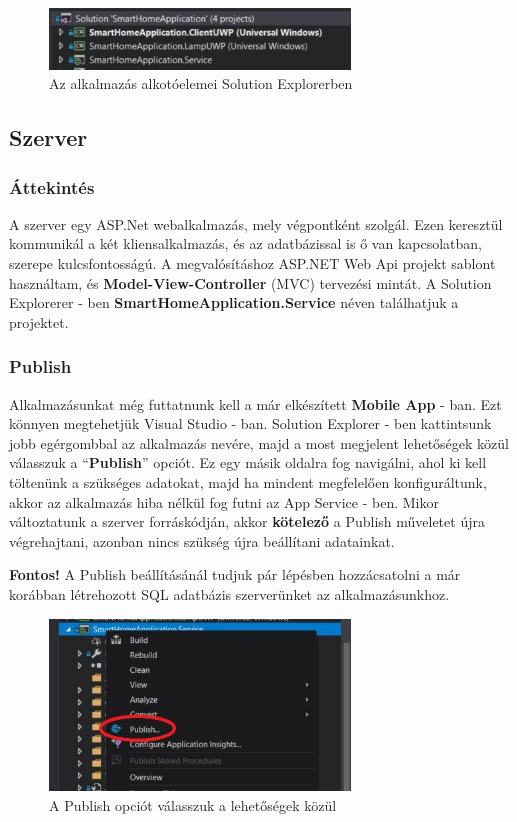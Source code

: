 \documentclass[a4paper,12pt]{report}
\begin{document}
\begin{figure}[H]
    \centering
    \includegraphics[width=8cm]{images/structure.jpg}
    \caption{Az alkalmazás alkotóelemei Solution Explorerben}
    \label{fig: SolutionExplorer}
\end{figure}

\subsection{Szerver}

\subsubsection{Áttekintés}
    A szerver egy ASP.Net webalkalmazás, mely végpontként szolgál. Ezen keresztül kommunikál a két kliensalkalmazás, és az adatbázissal
    is ő van kapcsolatban, szerepe kulcsfontosságú. A megvalósításhoz ASP.NET Web Api projekt sablont használtam, és \textbf{Model-View-Controller}
    (MVC) tervezési mintát. A Solution Explorerer - ben \textbf{SmartHomeApplication.Service} néven találhatjuk a projektet.

\subsubsection{Publish}
    Alkalmazásunkat még futtatnunk kell a már elkészített \textbf{Mobile App} - ban. Ezt könnyen megtehetjük Visual Studio - ban.
    Solution Explorer - ben kattintsunk jobb egérgombbal az alkalmazás nevére, majd a most megjelent lehetőségek közül válasszuk
    a ``\textbf{Publish}'' opciót. Ez egy másik oldalra fog navigálni, ahol ki kell töltenünk a szükséges adatokat, majd ha mindent
    megfelelően konfiguráltunk, akkor az alkalmazás hiba nélkül fog futni az App Service - ben.
    Mikor változtatunk a szerver forráskódján, akkor \textbf{kötelező} a Publish műveletet újra végrehajtani, azonban nincs szükség
    újra beállítani adatainkat.

    \textbf{Fontos!} A Publish beállításánál tudjuk pár lépésben hozzácsatolni a már korábban létrehozott SQL adatbázis szerverünket az alkalmazásunkhoz.

\begin{figure}[H]
    \centering
    \includegraphics[width=8cm]{images/publishbutton.jpg}
    \caption{A Publish opciót válasszuk a lehetőségek közül}
    \label{fig: Publish}
\end{figure}
\end{document}
